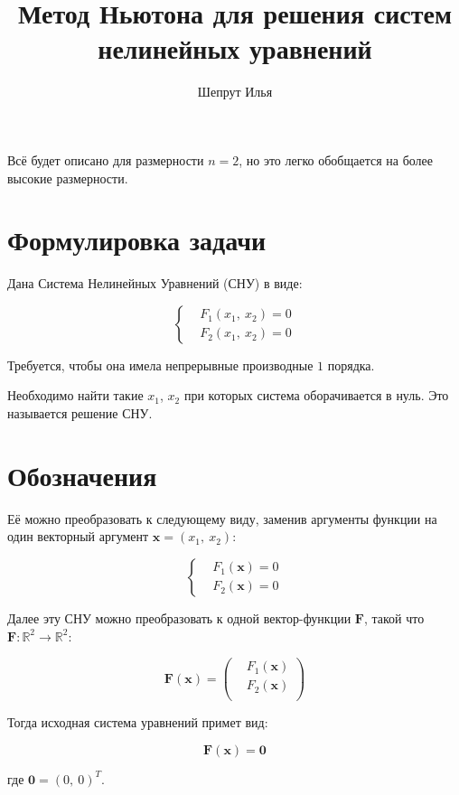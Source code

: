 \documentclass[12pt, a4paper]{article}
\newcommand{\roubr}[1]{\left(#1\right)}
\begin{document}
\title{Метод Ньютона для решения систем нелинейных уравнений}
\author{Шепрут Илья}
\maketitle

Всё будет описано для размерности $n = 2$, но это легко обобщается на более высокие размерности.

\section{Формулировка задачи}

Дана Система Нелинейных Уравнений (СНУ) в виде:

$$\left\{
\begin{aligned}
	&F_1(x_1,\ x_2) = 0 \\
	&F_2(x_1,\ x_2) = 0
\end{aligned}
\right.
$$

Требуется, чтобы она имела непрерывные производные $1$ порядка.

Необходимо найти такие $x_1$, $x_2$ при которых система оборачивается в нуль. Это называется решение СНУ.

\section{Обозначения}

Её можно преобразовать к следующему виду, заменив аргументы функции на один векторный аргумент $\mathbf{x} = (x_1,\ x_2)$:

$$\left\{
\begin{aligned}
	&F_1(\mathbf{x}) = 0 \\
	&F_2(\mathbf{x}) = 0
\end{aligned}
\right.
$$

Далее эту СНУ можно преобразовать к одной вектор-функции $\mathbf{F}$, такой что $ \mathbf{F} : \mathbb{R}^2 \to \mathbb{R}^2 $:

$$\mathbf{F}(\mathbf{x}) = \roubr{
\begin{aligned}
	&F_1(\mathbf{x})\\
	&F_2(\mathbf{x})\\
\end{aligned}
}
$$

Тогда исходная система уравнений примет вид:

$$\mathbf{F}(\mathbf{x}) = \mathbf{0}$$

где $\mathbf{0}= (0,\ 0)^T$.
\end{document}
